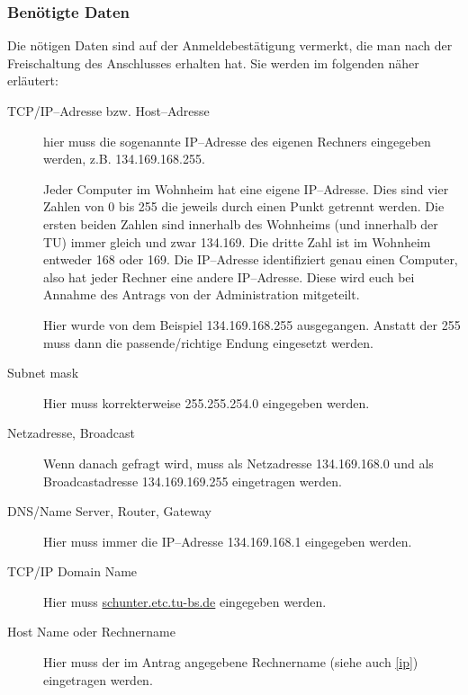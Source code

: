 \subsubsection{Benötigte Daten}
Die nötigen Daten sind auf der Anmeldebestätigung vermerkt, die man
nach der Freischaltung des Anschlusses erhalten hat. Sie werden im
folgenden näher erläutert:
\begin{description}
  \item[TCP/IP--Adresse bzw. Host--Adresse] hier muss die sogenannte IP--Adresse
    des eigenen Rechners eingegeben werden, z.B. 134.169.168.255. 

    Jeder Computer im Wohnheim hat eine eigene IP--Adresse. Dies sind vier
    Zahlen von 0 bis 255 die jeweils durch einen Punkt getrennt werden. Die
    ersten beiden Zahlen sind innerhalb des Wohnheims (und innerhalb der TU)
    immer gleich und zwar 134.169. Die dritte Zahl ist im Wohnheim entweder
    168 oder 169. 
    Die IP--Adresse identifiziert genau einen Computer, also hat jeder Rechner
    eine andere IP--Adresse. Diese wird euch bei Annahme des Antrags von
    der \glossar Administration mitgeteilt.

    Hier wurde von dem Beispiel 134.169.168.255 ausgegangen. Anstatt der 255
    muss dann die passende/richtige Endung eingesetzt werden. 

  \item[Subnet mask] Hier muss korrekterweise 255.255.254.0 eingegeben
    werden.

  \item[Netzadresse, Broadcast] Wenn danach gefragt wird, muss als Netzadresse
    134.169.168.0 und als Broadcastadresse 134.169.169.255 eingetragen werden.

  \item[DNS/Name Server, Router, Gateway] Hier muss immer die
    IP--Adresse 134.169.168.1 eingegeben werden.
 
  \item[TCP/IP Domain Name] Hier muss \url{schunter.etc.tu-bs.de} eingegeben
    werden.

  \item[Host Name oder Rechnername] Hier muss der im Antrag angegebene
    Rechnername (siehe auch \ref{ip}) eingetragen werden.
 
\end{description}

